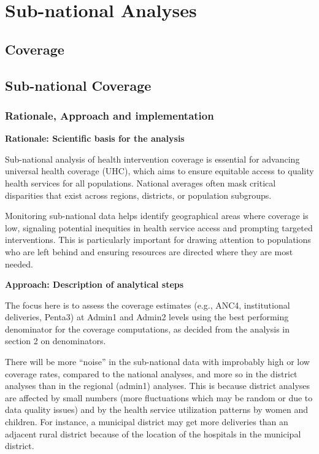 \documentclass[
  english,
  letterpaper,
  DIV=11,
  numbers=noendperiod]{scrreprt}
\begin{document}
\part{Sub-national Analyses}

\chapter{Coverage}\label{coverage-1}

\chapter{Sub-national Coverage}\label{sec-subnat-coverage}

\section{Rationale, Approach and
implementation}\label{rationale-approach-and-implementation-4}

\textbf{Rationale: Scientific basis for the analysis}

Sub-national analysis of health intervention coverage is essential for
advancing universal health coverage (UHC), which aims to ensure
equitable access to quality health services for all populations.
National averages often mask critical disparities that exist across
regions, districts, or population subgroups.

Monitoring sub-national data helps identify geographical areas where
coverage is low, signaling potential inequities in health service access
and prompting targeted interventions. This is particularly important for
drawing attention to populations who are left behind and ensuring
resources are directed where they are most needed.

\textbf{Approach: Description of analytical steps}

The focus here is to assess the coverage estimates (e.g., ANC4,
institutional deliveries, Penta3) at Admin1 and Admin2 levels using the
best performing denominator for the coverage computations, as decided
from the analysis in section 2 on denominators.

There will be more ``noise'' in the sub-national data with improbably
high or low coverage rates, compared to the national analyses, and more
so in the district analyses than in the regional (admin1) analyses. This
is because district analyses are affected by small numbers (more
fluctuations which may be random or due to data quality issues) and by
the health service utilization patterns by women and children. For
instance, a municipal district may get more deliveries than an adjacent
rural district because of the location of the hospitals in the municipal
district.
\end{document}
